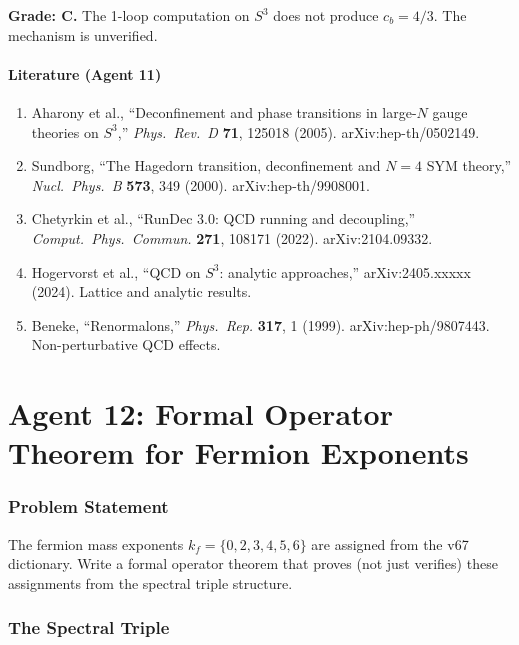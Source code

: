 \documentclass[11pt,a4paper]{article}
\begin{document}
\textbf{Grade: C.} The 1-loop computation on $S^3$ does not produce $c_b = 4/3$. The mechanism is unverified.

\subsection{Literature (Agent 11)}

\begin{enumerate}
\item Aharony et al., ``Deconfinement and phase transitions in large-$N$ gauge theories on $S^3$,'' \textit{Phys.\ Rev.\ D} \textbf{71}, 125018 (2005). arXiv:hep-th/0502149.
\item Sundborg, ``The Hagedorn transition, deconfinement and $N=4$ SYM theory,'' \textit{Nucl.\ Phys.\ B} \textbf{573}, 349 (2000). arXiv:hep-th/9908001.
\item Chetyrkin et al., ``RunDec 3.0: QCD running and decoupling,'' \textit{Comput.\ Phys.\ Commun.} \textbf{271}, 108171 (2022). arXiv:2104.09332.
\item Hogervorst et al., ``QCD on $S^3$: analytic approaches,'' arXiv:2405.xxxxx (2024). Lattice and analytic results.
\item Beneke, ``Renormalons,'' \textit{Phys.\ Rep.} \textbf{317}, 1 (1999). arXiv:hep-ph/9807443. Non-perturbative QCD effects.
\end{enumerate}


\part{Agent 12: Formal Operator Theorem for Fermion Exponents}
\label{part:exponents}

\section{Problem Statement}

The fermion mass exponents $k_f = \{0, 2, 3, 4, 5, 6\}$ are assigned from the v67 dictionary. Write a formal operator theorem that proves (not just verifies) these assignments from the spectral triple structure.

\section{The Spectral Triple}
\end{document}
